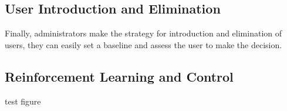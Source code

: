 
\subsection{User Introduction and Elimination} %
\label{sub:control}
Finally, administrators make the strategy for introduction and elimination of users, they can easily set a baseline and assess the user to make the decision.  

\subsection{Reinforcement Learning and Control} %
\label{sub:reinforcement_learning_and_control}
test figure


